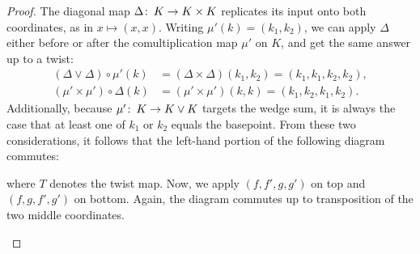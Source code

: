 \begin{proof}
The diagonal map $\Delta\colon\thinspace K \to K \times K$ replicates its input onto both coordinates, as in $x \mapsto (x, x)$.
Writing $\mu'(k) = (k_1, k_2)$, we can apply $\Delta$ either before or after the comultiplication map $\mu'$ on $K$, and get the same answer up to a twist:
\begin{align*}
(\Delta \vee \Delta) \circ \mu'(k) & = (\Delta \times \Delta)(k_1, k_2) = (k_1, k_1, k_2, k_2), \\
(\mu' \times \mu') \circ \Delta(k) & = (\mu' \times \mu')(k, k) = (k_1, k_2, k_1, k_2).
\end{align*}
Additionally, because $\mu'\colon\thinspace K \to K \vee K$ targets the wedge sum, it is always the case that at least one of $k_1$ or $k_2$ equals the basepoint.
From these two considerations, it follows that the left-hand portion of the following diagram commutes:
\begin{center}
\end{center}
where $T$ denotes the twist map.
Now, we apply $(f, f', g, g')$ on top and $(f, g, f', g')$ on bottom.
Again, the diagram commutes up to transposition of the two middle coordinates.
\begin{center}
\end{center}
\end{proof}
